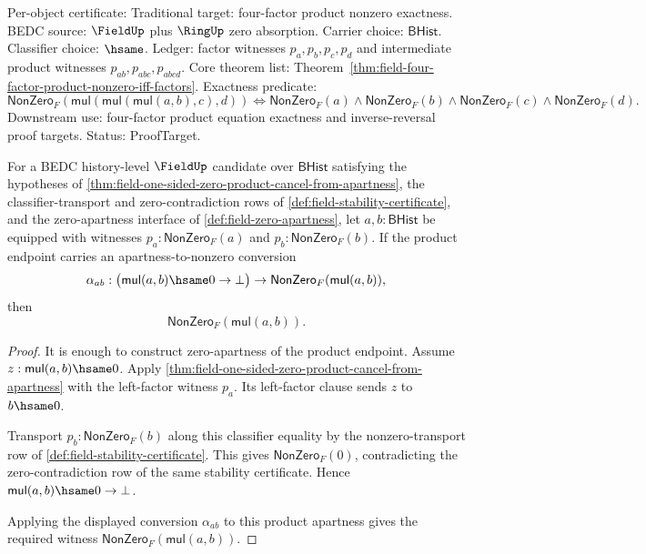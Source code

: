 Per-object certificate: Traditional target: four-factor product nonzero
exactness. BEDC source: $\FieldUp$ plus $\RingUp$ zero absorption. Carrier
choice: $\mathsf{BHist}$. Classifier choice: $\hsame$. Ledger: factor
witnesses $p_a,p_b,p_c,p_d$ and intermediate product witnesses
$p_{ab},p_{abc},p_{abcd}$. Core theorem list:
Theorem~\ref{thm:field-four-factor-product-nonzero-iff-factors}. Exactness
predicate:
$$
\mathsf{NonZero}_F(\mathsf{mul}(\mathsf{mul}(\mathsf{mul}(a,b),c),d))
\Longleftrightarrow
\mathsf{NonZero}_F(a)\wedge\mathsf{NonZero}_F(b)\wedge
\mathsf{NonZero}_F(c)\wedge\mathsf{NonZero}_F(d).
$$
Downstream use: four-factor product equation exactness and inverse-reversal
proof targets. Status: ProofTarget.

\begin{theorem}
\label{thm:field-nonzero-product-rigidity}
For a BEDC history-level $\FieldUp$ candidate over $\mathsf{BHist}$ satisfying the hypotheses of
\autoref{thm:field-one-sided-zero-product-cancel-from-apartness}, the classifier-transport and zero-contradiction rows of
\autoref{def:field-stability-certificate}, and the zero-apartness interface of
\autoref{def:field-zero-apartness}, let $a,b:\mathsf{BHist}$ be equipped with witnesses
$p_a:\mathsf{NonZero}_F(a)$ and $p_b:\mathsf{NonZero}_F(b)$. If the product endpoint carries an apartness-to-nonzero conversion
$$
\alpha_{ab}:\bigl(\mathsf{mul}(a,b)\hsame0\to\bot\bigr)\to
\mathsf{NonZero}_F(\mathsf{mul}(a,b)),
$$
then
$$
\mathsf{NonZero}_F(\mathsf{mul}(a,b)).
$$
\end{theorem}
\begin{proof}
It is enough to construct zero-apartness of the product endpoint. Assume
$z:\mathsf{mul}(a,b)\hsame0$. Apply
\autoref{thm:field-one-sided-zero-product-cancel-from-apartness} with the left-factor witness $p_a$. Its left-factor clause sends $z$ to
$b\hsame0$.

Transport $p_b:\mathsf{NonZero}_F(b)$ along this classifier equality by the nonzero-transport row of \autoref{def:field-stability-certificate}. This gives
$\mathsf{NonZero}_F(0)$, contradicting the zero-contradiction row of the same stability certificate. Hence
$\mathsf{mul}(a,b)\hsame0\to\bot$.

Applying the displayed conversion $\alpha_{ab}$ to this product apartness gives the required witness
$\mathsf{NonZero}_F(\mathsf{mul}(a,b))$.
\end{proof}
